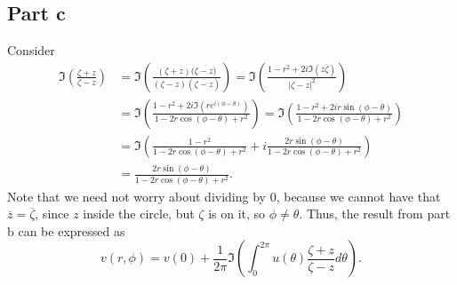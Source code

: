 \documentclass{article}
\begin{document}
\subsection{Part c}
Consider
\begin{align*}
\Im\left(\frac{\zeta+z}{\zeta-z}\right)&=\Im\left(\frac{(\zeta+z)(\overline{\zeta-z)}}{(\zeta-z)(\overline{\zeta-z})}\right)=\Im\left(\frac{1-r^2+2i\Im(z\overline{\zeta})}{|\zeta-z|^2}\right)\\&=
\Im\left(\frac{1-r^2+2i\Im(re^{i(\phi-\theta)})}{1-2r\cos(\phi-\theta)+r^2}\right)=\Im\left(\frac{1-r^2+2ir\sin(\phi-\theta)}{1-2r\cos(\phi-\theta)+r^2}\right)\\&=\Im\left(\frac{1-r^2}{1-2r\cos(\phi-\theta)+r^2}+i\frac{2r\sin(\phi-\theta)}{1-2r\cos(\phi-\theta)+r^2}\right)\\&=
\frac{2r\sin(\phi-\theta)}{1-2r\cos(\phi-\theta)+r^2}.
\end{align*}
Note that we need not worry about dividing by 0, because we cannot have that $\overline{z}=\overline{\zeta}$, since $z$ inside the circle, but $\zeta$ is on it, so $\phi\neq\theta$. Thus, the result from part b can be expressed as 
\[
v(r,\phi)=v(0)+\frac{1}{2\pi}\Im\left(\int_0^{2\pi}u(\theta)\frac{\zeta+z}{\zeta-z}d\theta\right).
\]
\end{document}
